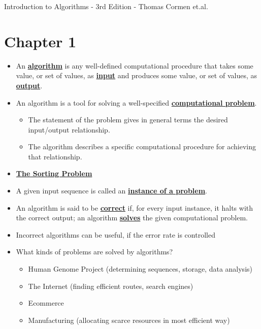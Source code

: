 \documentclass{article}
\newcommand{\definition}[1]{\underline{\textbf{#1}}}
\begin{document}
Introduction to Algorithms - 3rd Edition - Thomas Cormen et.al.

\section*{Chapter 1}

\begin{itemize}

    \item An \definition{algorithm} is any well-defined computational procedure that takes some value, or set of values, as \definition{input} and produces some value, or set of values, as \definition{output}.

    \item An algorithm is a tool for solving a well-specified \definition{computational problem}.
    \begin{itemize}
        \item The statement of the problem gives in general terms the desired input/output relationship.
        \item The algorithm describes a specific computational procedure for achieving that relationship.
    \end{itemize}

    \item \definition{The Sorting Problem}

    \item A given input sequence is called an \definition{instance of a problem}.

    \item An algorithm is said to be \definition{correct} if, for every input instance, it halts with the correct output; an algorithm \definition{solves} the given computational problem.

    \item Incorrect algorithms can be useful, if the error rate is controlled

    \item What kinds of problems are solved by algorithms?
    \begin{itemize}
        \item Human Genome Project (determining sequences, storage, data analysis)
        \item The Internet (finding efficient routes, search engines)
        \item Ecommerce
        \item Manufacturing (allocating scarce resources in most efficient way)
    \end{itemize}

\end{itemize}
\end{document}
